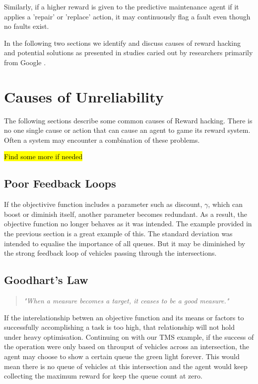 Similarly, if a higher reward is given to the predictive maintenance agent if it applies a 'repair' or 'replace' action, it may continuously flag a fault even though no faults exist. 

In the following two sections we identify and discuss causes of reward hacking and potential solutions as presented in studies caried out by researchers primarily from Google \cite{Amodei} \cite{DBLP:journals/corr/abs-1908-04734}.

\section{Causes of Unreliability}
The following sections describe some common causes of Reward hacking.
There is no one single cause or action that can cause an agent to game its reward system. 
Often a system may encounter a combination of these problems.

\hl{Find some more if needed}

\subsection{Poor Feedback Loops}
If the objectivive function includes a parameter such as discount, $\gamma$, which can boost or diminish itself, another parameter becomes redundant.
As a result, the objective function no longer behaves as it was intended.
The example provided in the previous section is a great example of this. The standard deviation was intended to equalise the importance of all queues.
But it may be diminished by the strong feedback loop of vehicles passing through the intersections.

\subsection{Goodhart's Law}
\begin{quotation}
    \textit{"When a measure becomes a target, it ceases to be a good measure."}
\end{quotation}
If the interelationship betwen an objective function and its means or factors to successfully accomplishing a task is too high,
that relationship will not hold under heavy optimisation. 
Continuing on with our TMS example, if the success of the operation were only based on throuput of vehicles across an intersection,
the agent may choose to show a certain queue the green light forever. 
This would mean there is no queue of vehicles at this intersection and the agent would keep collecting the maximum reward for keep the queue count at zero.

